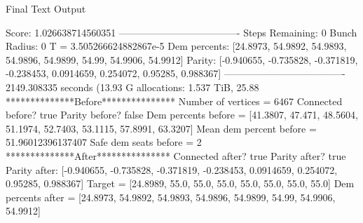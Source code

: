 Final Text Output

Score: 1.026638714560351
-------------------------------------
Steps Remaining: 0
Bunch Radius: 0
T = 3.505266624882867e-5
Dem percents: [24.8973, 54.9892, 54.9893, 54.9896, 54.9899, 54.99, 54.9906, 54.9912]
Parity: [-0.940655, -0.735828, -0.371819, -0.238453, 0.0914659, 0.254072, 0.95285, 0.988367]
-------------------------------------
2149.308335 seconds (13.93 G allocations: 1.537 TiB, 25.88%
**************Before***************
Number of vertices = 6467
Connected before? true
Parity before? false
Dem percents before = [41.3807, 47.471, 48.5604, 51.1974, 52.7403, 53.1115, 57.8991, 63.3207]
Mean dem percent before = 51.96012396137407
Safe dem seats before = 2
**************After***************
Connected after? true
Parity after? true
Parity after: [-0.940655, -0.735828, -0.371819, -0.238453, 0.0914659, 0.254072, 0.95285, 0.988367]
Target = [24.8989, 55.0, 55.0, 55.0, 55.0, 55.0, 55.0, 55.0]
Dem percents after = [24.8973, 54.9892, 54.9893, 54.9896, 54.9899, 54.99, 54.9906, 54.9912]